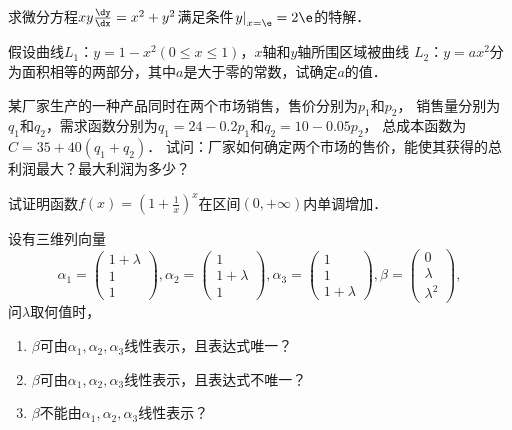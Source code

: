\documentclass[plain,noanswer,medmath]{../../template/jnuexam}
\begin{document}
\begin{problem}
求微分方程$xy\frac{\dy}{\dx} = x^2 + y^2$满足条件$\left. y \right|_{x = \e} = 2\e$的特解．
\end{problem}



\begin{problem}
假设曲线$L_1$：$y = 1 - x^2\left(0 \le x \le 1 \right)$，$x$轴和$y$轴所围区域被曲线
$L_2$：$y = ax^2$分为面积相等的两部分，其中$a$是大于零的常数，试确定$a$的值．
\end{problem}



\begin{problem}
某厂家生产的一种产品同时在两个市场销售，售价分别为$p_1$和$p_2$，
销售量分别为$q_1$和$q_2$，需求函数分别为$q_1 = 24 - 0.2p_1$和$q_2 = 10 - 0.05p_2$，
总成本函数为$C = 35 + 40\left(q_1 + q_2 \right)$．
试问：厂家如何确定两个市场的售价，能使其获得的总利润最大？最大利润为多少？
\end{problem}



\begin{problem}
试证明函数$f(x) = \left(1 + \frac{1}{x} \right)^x$在区间$(0, +\infty)$内单调增加．
\end{problem}



\begin{problem}
设有三维列向量
$$\alpha_1 = \begin{pmatrix}
  1 + \lambda \\
  1 \\
  1
\end{pmatrix},\alpha_2 = \begin{pmatrix}
  1 \\
  1 + \lambda \\
  1
\end{pmatrix},\alpha_3 = \begin{pmatrix}
  1 \\
  1 \\
  1 + \lambda
\end{pmatrix},\beta = \begin{pmatrix}
  0 \\
  \lambda \\
  \lambda^2
\end{pmatrix},$$
问$\lambda$取何值时，
\begin{enumerate}
\item $\beta$可由$\alpha_1,\alpha_2,\alpha_3$线性表示，且表达式唯一？
\item $\beta$可由$\alpha_1,\alpha_2,\alpha_3$线性表示，且表达式不唯一？
\item $\beta$不能由$\alpha_1,\alpha_2,\alpha_3$线性表示？
\end{enumerate}
\end{problem}
\end{document}
